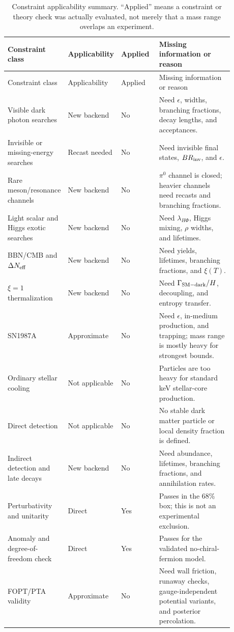 \documentclass[11pt]{article}
\newcommand{\lamHP}{\lambda_{H\Phi}}
\newcommand{\eps}{\epsilon}
\begin{document}
\begin{longtable}{p{0.20\linewidth}p{0.17\linewidth}p{0.17\linewidth}p{0.34\linewidth}}
\caption{Constraint applicability summary. ``Applied'' means a constraint or theory check was actually evaluated, not merely that a mass range overlaps an experiment.}\label{tab:constraints}\\
\toprule
Constraint class & Applicability & Applied & Missing information or reason \\
\midrule
\endfirsthead
\toprule
Constraint class & Applicability & Applied & Missing information or reason \\
\midrule
\endhead
Visible dark photon searches \cite{BaBar:2014,LHCb:2017,Ilten:2018} & New backend & No & Need \(\eps\), widths, branching fractions, decay lengths, and acceptances. \\
Invisible or missing-energy searches \cite{BaBarInvisible:2017} & Recast needed & No & Need invisible final states, \(BR_{\rm inv}\), and \(\eps\). \\
Rare meson/resonance channels \cite{CosmicVisions:2017} & New backend & No & \(\pi^0\) channel is closed; heavier channels need recasts and branching fractions. \\
Light scalar and Higgs exotic searches \cite{Fradette:2018,FIPs:2023} & New backend & No & Need \(\lamHP\), Higgs mixing, \(\rho\) widths, and lifetimes. \\
BBN/CMB and \(\Delta N_{\rm eff}\) \cite{Berger:2016,Fujikura:2023} & New backend & No & Need yields, lifetimes, branching fractions, and \(\xi(T)\). \\
\(\xi=1\) thermalization \cite{Balan:2025} & New backend & No & Need \(\Gamma_{\rm SM-dark}/H\), decoupling, and entropy transfer. \\
SN1987A \cite{Mahoney:2017} & Approximate & No & Need \(\eps\), in-medium production, and trapping; mass range is mostly heavy for strongest bounds. \\
Ordinary stellar cooling \cite{FIPs:2023} & Not applicable & No & Particles are too heavy for standard keV stellar-core production. \\
Direct detection \cite{An:2014} & Not applicable & No & No stable dark matter particle or local density fraction is defined. \\
Indirect detection and late decays \cite{Mondino:2020} & New backend & No & Need abundance, lifetimes, branching fractions, and annihilation rates. \\
Perturbativity and unitarity & Direct & Yes & Passes in the 68\% box; this is not an experimental exclusion. \\
Anomaly and degree-of-freedom check & Direct & Yes & Passes for the validated no-chiral-fermion model. \\
FOPT/PTA validity \cite{Feng:2026} & Approximate & No & Need wall friction, runaway checks, gauge-independent potential variants, and posterior percolation. \\
\bottomrule
\end{longtable}
\end{document}
